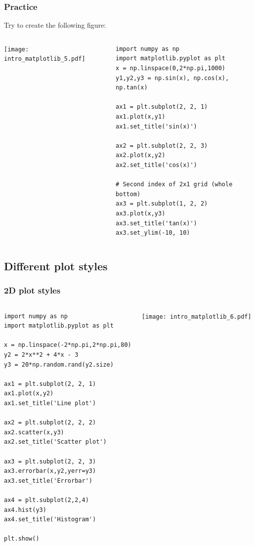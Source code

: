 \begin{frame}[fragile]
  \frametitle{Practice}
  Try to create the following figure:
  \begin{columns}
      \texttt{[image: intro\_matplotlib\_5.pdf]}

        \begin{lstlisting}[]
import numpy as np
import matplotlib.pyplot as plt
x = np.linspace(0,2*np.pi,1000)
y1,y2,y3 = np.sin(x), np.cos(x), np.tan(x)

ax1 = plt.subplot(2, 2, 1) 
ax1.plot(x,y1)
ax1.set_title('sin(x)')

ax2 = plt.subplot(2, 2, 3) 
ax2.plot(x,y2)
ax2.set_title('cos(x)')

# Second index of 2x1 grid (whole bottom)
ax3 = plt.subplot(1, 2, 2) 
ax3.plot(x,y3)
ax3.set_title('tan(x)')
ax3.set_ylim(-10, 10)
        \end{lstlisting}
  \end{columns}
\end{frame}

{\nologo
\subsection{Different plot styles}
\begin{frame}[fragile]
  \frametitle{2D plot styles}
  \begin{columns}[T]
      \begin{lstlisting}
import numpy as np
import matplotlib.pyplot as plt

x = np.linspace(-2*np.pi,2*np.pi,80)
y2 = 2*x**2 + 4*x - 3
y3 = 20*np.random.rand(y2.size)

ax1 = plt.subplot(2, 2, 1) 
ax1.plot(x,y2)
ax1.set_title('Line plot')

ax2 = plt.subplot(2, 2, 2) 
ax2.scatter(x,y3)
ax2.set_title('Scatter plot')

ax3 = plt.subplot(2, 2, 3) 
ax3.errorbar(x,y2,yerr=y3)
ax3.set_title('Errorbar')

ax4 = plt.subplot(2,2,4)
ax4.hist(y3)
ax4.set_title('Histogram')

plt.show()
      \end{lstlisting}
      \texttt{[image: intro\_matplotlib\_6.pdf]}
  \end{columns}
\end{frame}
}

